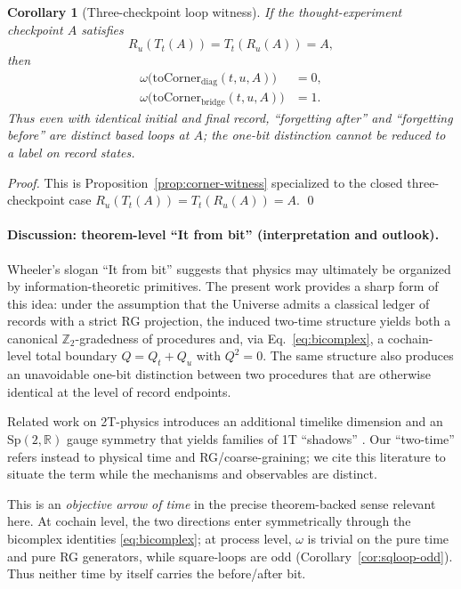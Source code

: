\documentclass[aps,prl,reprint,floatfix]{revtex4-2}
\theoremstyle{plain}
\newtheorem{corollary}{Corollary}
\theoremstyle{definition}
\begin{document}
\begin{corollary}[Three-checkpoint loop witness]
\label{cor:groundhog-loop}
If the thought-experiment checkpoint $A$ satisfies
\[
R_u(T_t(A))=T_t(R_u(A))=A,
\]
then
\[
\begin{aligned}
\omega\big(\mathrm{toCorner}_{\mathrm{diag}}(t,u,A)\big)&=0,\\
\omega\big(\mathrm{toCorner}_{\mathrm{bridge}}(t,u,A)\big)&=1.
\end{aligned}
\]
Thus even with identical initial and final record, ``forgetting after'' and ``forgetting before'' are distinct based loops at $A$; the one-bit distinction cannot be reduced to a label on record states.
\end{corollary}

\noindent\emph{Proof.}
This is Proposition~\ref{prop:corner-witness} specialized to the closed three-checkpoint case $R_u(T_t(A))=T_t(R_u(A))=A$. \qed

\paragraph{Discussion: theorem-level ``It from bit'' (interpretation and outlook).}
Wheeler’s slogan “It from bit” \cite{Wheeler1990ItFromBit} suggests that physics may ultimately be organized by information-theoretic primitives.
The present work provides a sharp form of this idea: under the assumption that the Universe admits a classical ledger of records
with a strict RG projection, the induced two-time structure yields both a canonical $\mathbb Z_2$-gradedness of procedures and,
via Eq.~\ref{eq:bicomplex}, a cochain-level total boundary $Q=Q_t+Q_u$ with $Q^2=0$. The same structure also produces an unavoidable
one-bit distinction between two procedures that are otherwise identical at the level of record endpoints.

Related work on 2T-physics introduces an additional timelike dimension and an Sp$(2,\mathbb R)$ gauge symmetry that yields families of 1T ``shadows'' \cite{Bars1998TwoTime,Bars2000TwoTimeField,Bars2008Gravity}.
Our ``two-time'' refers instead to physical time and RG/coarse-graining; we cite this literature to situate the term while the mechanisms and observables are distinct.

This is an \emph{objective arrow of time} in the precise theorem-backed sense relevant here. At cochain level, the two directions enter symmetrically through the bicomplex identities \eqref{eq:bicomplex}; at process level, $\omega$ is trivial on the pure time and pure RG generators, while square-loops are odd (Corollary~\ref{cor:sqloop-odd}). Thus neither time by itself carries the before/after bit.
\end{document}
